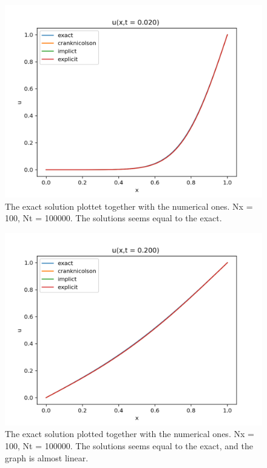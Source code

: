 \documentclass{article}
\begin{document}
\begin{figure}
  \includegraphics[width=\linewidth]{Nt100000Nx100t02.png}
  \caption{The exact solution plottet together with the numerical ones. Nx = 100, Nt = 100000. The solutions seems equal to the exact.}
  \label{fig:Nt100000Nx100t02}
\end{figure} 

\begin{figure}
  \includegraphics[width=\linewidth]{Nt100000Nx100t2.png}
  \caption{The exact solution plotted together with the numerical ones. Nx = 100, Nt = 100000. The solutions seems equal to the exact, and the graph is almost linear.}
  \label{fig:Nt100000Nx100t2}
\end{figure} 
\end{document}
